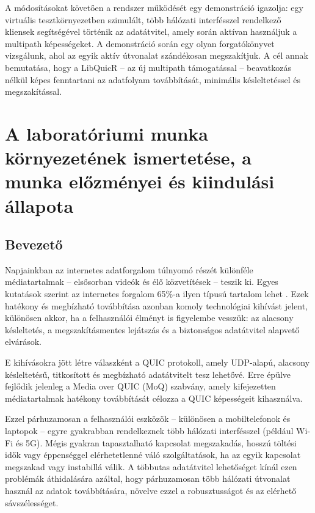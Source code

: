 \documentclass[a4paper,oneside]{article}
\begin{document}
\begin{titlepage}
{  A módosításokat követően a rendszer működését egy demonstráció
  igazolja: egy virtuális tesztkörnyezetben szimulált, több hálózati 
  interfésszel rendelkező kliensek segítségével történik az adatátvitel, 
  amely során aktívan használjuk a multipath képességeket. A demonstráció 
  során egy olyan forgatókönyvet vizsgálunk, ahol az egyik aktív 
  útvonalat szándékosan megszakítjuk. 
  A cél annak bemutatása, hogy a LibQuicR – az új multipath támogatással – 
  beavatkozás nélkül képes fenntartani az adatfolyam 
  továbbítását, minimális késleltetéssel és megszakítással.}

 
  
 
\end{titlepage} 

\section{A laboratóriumi munka környezetének ismertetése,
     a munka előzményei és kiindulási állapota}
\label{sec:kornyezet}
\subsection{Bevezető}
\label{sec:bevezeto}
Napjainkban az internetes adatforgalom túlnyomó részét különféle médiatartalmak – 
elsősorban videók és élő közvetítések – teszik ki. Egyes kutatások 
szerint az internetes forgalom 65\%-a ilyen típusú tartalom lehet \cite{live_stats}. 
Ezek hatékony és megbízható továbbítása azonban komoly 
technológiai kihívást jelent, különösen akkor, ha a felhasználói élményt is 
figyelembe vesszük: az alacsony késleltetés, a megszakításmentes lejátszás 
és a biztonságos adatátvitel alapvető elvárások.

E kihívásokra jött létre válaszként a QUIC protokoll, amely UDP-alapú, alacsony 
késleltetésű, titkosított és megbízható adatátvitelt tesz lehetővé. Erre épülve 
fejlődik jelenleg a Media over QUIC (MoQ) szabvány, amely kifejezetten 
médiatartalmak hatékony továbbítását célozza a QUIC képességeit kihasználva.

Ezzel párhuzamosan a felhasználói eszközök – különösen a mobiltelefonok és 
laptopok – egyre gyakrabban rendelkeznek több hálózati interfésszel (például Wi-Fi és 5G). 
Mégis gyakran tapasztalható kapcsolat megszakadás, hosszú töltési idők vagy éppenséggel 
elérhetetlenné váló szolgáltatások, ha az egyik kapcsolat megszakad vagy instabillá 
válik. A többutas adatátvitel lehetőséget kínál ezen problémák áthidalására azáltal, 
hogy párhuzamosan több hálózati útvonalat használ az adatok továbbítására, növelve 
ezzel a robusztusságot és az elérhető sávszélességet.
\end{document}
